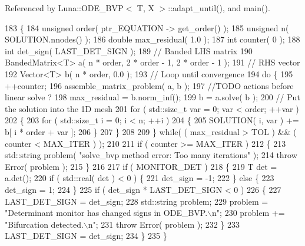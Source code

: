 Referenced by Luna\+::\+O\+D\+E\+\_\+\+B\+V\+P$<$ T, X $>$\+::adapt\+\_\+until(), and main().


\begin{DoxyCode}
183   \{
184     \textcolor{keywordtype}{unsigned} order( ptr\_EQUATION -> get\_order() );
185     \textcolor{keywordtype}{unsigned} n( SOLUTION.nnodes() );
186     \textcolor{keywordtype}{double} max\_residual( 1.0 );
187     \textcolor{keywordtype}{int} counter( 0 );
188     \textcolor{keywordtype}{int} det\_sign( LAST\_DET\_SIGN );
189     \textcolor{comment}{// Banded LHS matrix}
190     BandedMatrix<T> a( n * order, 2 * order - 1, 2 * order - 1 );
191     \textcolor{comment}{// RHS vector}
192     Vector<T> b( n * order, 0.0 );
193     \textcolor{comment}{// Loop until convergence}
194     \textcolor{keywordflow}{do} \{
195       ++counter;
196       assemble\_matrix\_problem( a, b );
197       \textcolor{comment}{//TODO actions before linear solve ?}
198       max\_residual = b.norm\_inf();
199       b = a.solve( b );
200       \textcolor{comment}{// Put the solution into the 1D mesh}
201       \textcolor{keywordflow}{for} ( std::size\_t var = 0; var < order; ++var )
202       \{
203         \textcolor{keywordflow}{for} ( std::size\_t i = 0; i < n; ++i )
204         \{
205           SOLUTION( i, var ) += b[ i * order + var ];
206         \}
207       \}
208 
209     \} \textcolor{keywordflow}{while}( ( max\_residual > TOL ) && ( counter < MAX\_ITER ) );
210 
211     \textcolor{keywordflow}{if} ( counter >= MAX\_ITER )
212     \{
213       std::string problem( \textcolor{stringliteral}{"solve\_bvp method error: Too many iterations"} );
214       \textcolor{keywordflow}{throw} Error( problem );
215     \}
216 
217     \textcolor{keywordflow}{if} ( MONITOR\_DET )
218     \{
219       T det = a.det();
220       \textcolor{keywordflow}{if} ( std::real( det ) < 0 ) \{
221         det\_sign = -1;
222       \} \textcolor{keywordflow}{else} \{
223         det\_sign = 1;
224       \}
225       \textcolor{keywordflow}{if} ( det\_sign * LAST\_DET\_SIGN < 0 )
226       \{
227         LAST\_DET\_SIGN = det\_sign;
228         std::string problem;
229         problem = \textcolor{stringliteral}{"Determinant monitor has changed signs in ODE\_BVP.\(\backslash\)n"};
230         problem += \textcolor{stringliteral}{"Bifurcation detected.\(\backslash\)n"};
231         \textcolor{keywordflow}{throw} Error( problem );
232       \}
233       LAST\_DET\_SIGN = det\_sign;
234     \}
235   \}
\end{DoxyCode}
\mbox{\label{classLuna_1_1ODE__BVP_a9b3eeb599a5d12ebb6bab1b80ff02844}} 
